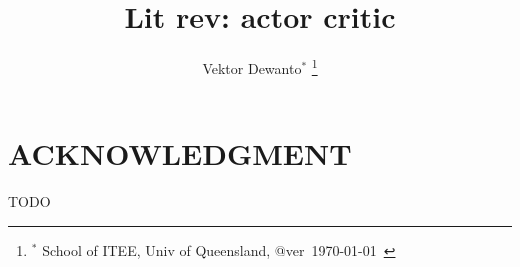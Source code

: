 \documentclass[letterpaper, 10 pt, conference]{ieeeconf}  %
\title{\LARGE \bf
Lit rev: actor critic
}
\author{Vektor Dewanto$^{*}$
\thanks{$^{*}$ School of ITEE, Univ of Queensland, @ver~\today~\currenttime}%
}
\begin{document}
\maketitle
\thispagestyle{empty}
\pagestyle{plain}





% 


\addtolength{\textheight}{-12cm}   %


\section*{ACKNOWLEDGMENT}
TODO



\end{document}
